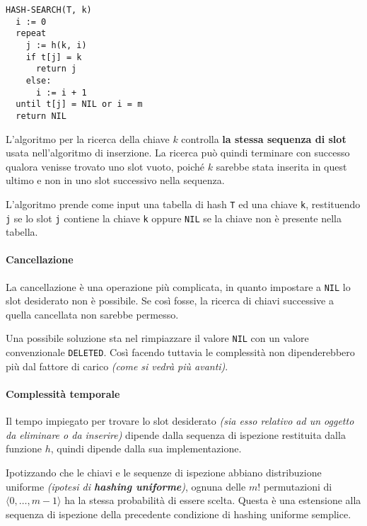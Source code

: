 \documentclass[italian, 10pt]{article}
\begin{document}
\begin{lstlisting}[float, style=pseudocode, caption={Pseudocodice dell'algoritmo \texttt{HASH-SEARCH}}, label={sec:ricerca-ind-aperto}]
HASH-SEARCH(T, k)
  i := 0
  repeat
    j := h(k, i)
    if t[j] = k
      return j
    else:
      i := i + 1
  until t[j] = NIL or i = m
  return NIL
\end{lstlisting}

L'algoritmo per la ricerca della chiave \(k\) controlla \textbf{la stessa sequenza di slot} usata nell'algoritmo di inserzione.
La ricerca può quindi terminare con successo qualora venisse trovato uno slot vuoto, poiché \(k\) sarebbe stata inserita in quest ultimo e non in uno slot successivo nella sequenza.

L'algoritmo prende come input una tabella di hash \texttt{T} ed una chiave \texttt{k}, restituendo \texttt{j} se lo slot \texttt{j} contiene la chiave \texttt{k} oppure \texttt{NIL} se la chiave non è presente nella tabella.

\paragraph{Cancellazione}

La cancellazione è una operazione più complicata, in quanto impostare a \texttt{NIL} lo slot desiderato non è possibile.
Se così fosse, la ricerca di chiavi successive a quella cancellata non sarebbe permesso.

Una possibile soluzione sta nel rimpiazzare il valore \texttt{NIL} con un valore convenzionale \texttt{DELETED}.
Così facendo tuttavia le complessità non dipenderebbero più dal fattore di carico \textit{(come si vedrà più avanti)}.

\paragraph{Complessità temporale}

Il tempo impiegato per trovare lo slot desiderato \textit{(sia esso relativo ad un oggetto da eliminare o da inserire)} dipende dalla sequenza di ispezione restituita dalla funzione \(h\), quindi dipende dalla sua implementazione.

Ipotizzando che le chiavi e le sequenze di ispezione abbiano distribuzione uniforme \textit{(ipotesi di \textbf{hashing uniforme})}, ognuna delle \(m!\) permutazioni di \(\langle 0, \ldots, m-1 \rangle\) ha la stessa probabilità di essere scelta.
Questa è una estensione alla sequenza di ispezione della precedente condizione di hashing uniforme semplice.
\end{document}
